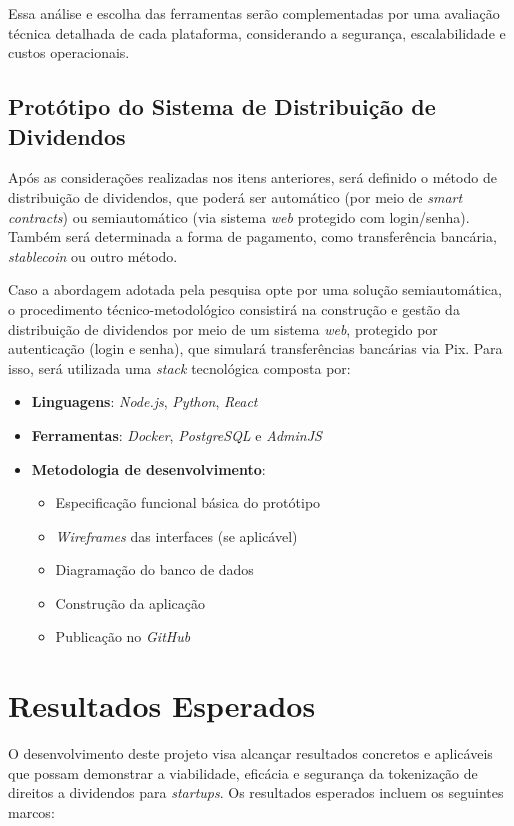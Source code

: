 \documentclass[12pt, a4paper, oneside, openright, chapter=TITLE]{abntex2}
\begin{document}
Essa análise e escolha das ferramentas serão complementadas por uma avaliação técnica detalhada de cada plataforma, considerando a segurança, escalabilidade e custos operacionais.

\subsection{Protótipo do Sistema de Distribuição de Dividendos}

\hspace*{\parindent} Após as considerações realizadas nos itens anteriores, será definido o método de distribuição de dividendos, que poderá ser automático (por meio de \textit{smart contracts}) ou semiautomático (via sistema \textit{web} protegido com login/senha). Também será determinada a forma de pagamento, como transferência bancária, \textit{stablecoin} ou outro método.

Caso a abordagem adotada pela pesquisa opte por uma solução semiautomática, o procedimento técnico-metodológico consistirá na construção e gestão da distribuição de dividendos por meio de um sistema \textit{web}, protegido por autenticação (login e senha), que simulará transferências bancárias via Pix. Para isso, será utilizada uma \textit{stack} tecnológica composta por:

\begin{itemize}
    \item \textbf{Linguagens}: \textit{Node.js}, \textit{Python}, \textit{React}
    \item \textbf{Ferramentas}: \textit{Docker}, \textit{PostgreSQL} e \textit{AdminJS}
    \item \textbf{Metodologia de desenvolvimento}:
    \begin{itemize}
        \item Especificação funcional básica do protótipo
        \item \textit{Wireframes} das interfaces (se aplicável)
        \item Diagramação do banco de dados
        \item Construção da aplicação
        \item Publicação no \textit{GitHub}
    \end{itemize}
\end{itemize}


\clearpage
\section{Resultados Esperados}
\hspace*{\parindent} O desenvolvimento deste projeto visa alcançar resultados concretos e aplicáveis que possam demonstrar a viabilidade, eficácia e segurança da tokenização de direitos a dividendos para \textit{startups}. Os resultados esperados incluem os seguintes marcos:
\end{document}
